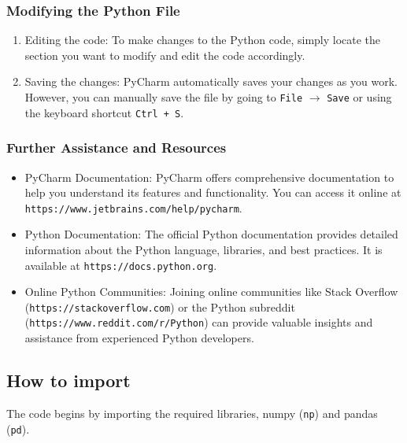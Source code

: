 \subsubsection{Modifying the Python File}
\begin{enumerate}
	\item Editing the code: To make changes to the Python code, simply locate the section you want to modify and edit the code accordingly.
	\item Saving the changes: PyCharm automatically saves your changes as you work. However, you can manually save the file by going to \texttt{File} $\rightarrow$ \texttt{Save} or using the keyboard shortcut \texttt{Ctrl + S}.
\end{enumerate}

\subsubsection{Further Assistance and Resources}
\begin{itemize}
	\item PyCharm Documentation: PyCharm offers comprehensive documentation to help you understand its features and functionality. You can access it online at \texttt{https://www.jetbrains.com/help/pycharm}.
	\item Python Documentation: The official Python documentation provides detailed information about the Python language, libraries, and best practices. It is available at \texttt{https://docs.python.org}.
	\item Online Python Communities: Joining online communities like Stack Overflow (\texttt{https://stackoverflow.com}) or the Python subreddit (\texttt{https://www.reddit.com/r/Python}) can provide valuable insights and assistance from experienced Python developers.
\end{itemize}


\subsection{How to import}
The code begins by importing the required libraries, numpy (\texttt{np}) and pandas (\texttt{pd}).

%	

